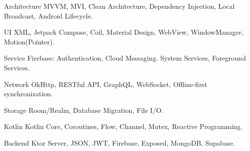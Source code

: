 \begin{cvskills}

    \cvskill
    {Architecture}
    {MVVM, MVI, Clean Architecture, Dependency Injection, Local Broadcast, Android Lifecycle.}

    \cvskill
    {UI}
    {XML, Jetpack Compose, Coil, Material Design, WebView, WindowManager, Motion(Pointer).}

    \cvskill
    {Service}
    {Firebase: Authentication, Cloud Messaging. System Services, Foreground Services.}

    \cvskill
    {Network}
    {OkHttp, RESTful API, GraphQL, WebSocket, Offline-first synchronization.}

    \cvskill
    {Storage}
    {Room/Realm, Database Migration, File I/O.}

    \cvskill
    {Kotlin}
    {Kotlin Core, Coroutines, Flow, Channel, Mutex, Reactive Programming.}

    \cvskill
    {Backend}
    {Ktor Server, JSON, JWT, Firebase, Exposed, MongoDB, Supabase.}

\end{cvskills}

